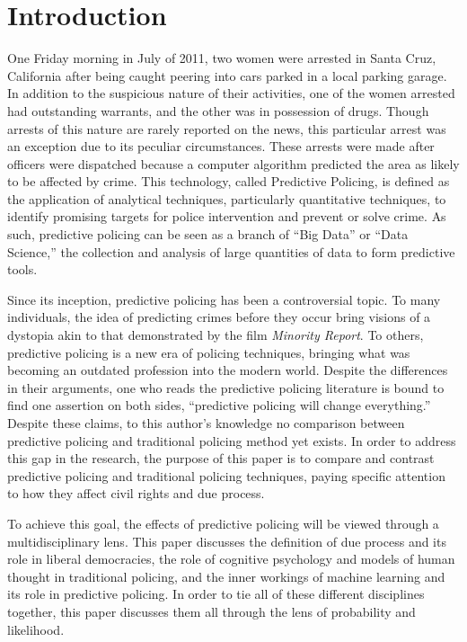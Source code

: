 \documentclass[12pt]{article} %
\begin{document}
\section{Introduction}\label{sec:introduction} %

One Friday morning in July of 2011, two women were arrested in Santa Cruz, California after being caught peering into cars parked in a local parking garage. In addition to the suspicious nature of their activities, one of the women arrested had outstanding warrants, and the other was in possession of drugs. Though arrests of this nature are rarely reported on the news, this particular arrest was an exception due to its peculiar circumstances. These arrests were made after officers were dispatched because a computer algorithm predicted the area as likely to be affected by crime. \cite{nyt} 
This technology, called Predictive Policing, is defined as the application of analytical techniques, particularly quantitative techniques, to identify promising targets for police intervention and prevent or solve crime. \cite{perryetal} As such, predictive policing can be seen as a branch of ``Big Data'' or ``Data Science,'' the collection and analysis of large quantities of data to form predictive tools.

Since its inception, predictive policing has been a controversial topic. To many individuals, the idea of predicting crimes before they occur bring visions of a dystopia akin to that demonstrated by the film \textit{Minority Report}. To others, predictive policing is a new era of policing techniques, bringing what was becoming an outdated profession into the modern world. Despite the differences in their arguments, one who reads the predictive policing literature is bound to find one assertion on both sides, ``predictive policing will change everything.'' Despite these claims, to this author's knowledge no comparison between predictive policing and traditional policing method yet exists. In order to address this gap in the research, the purpose of this paper is to compare and contrast predictive policing and traditional policing techniques, paying specific attention to how they affect civil rights and due process. 

To achieve this goal, the effects of predictive policing will be viewed through a multidisciplinary lens. This paper discusses the definition of due process and its role in liberal democracies, the role of cognitive psychology and models of human thought in traditional policing, and the inner workings of machine learning and its role in predictive policing. In order to tie all of these different disciplines together, this paper discusses them all through the lens of probability and likelihood.
\end{document}
